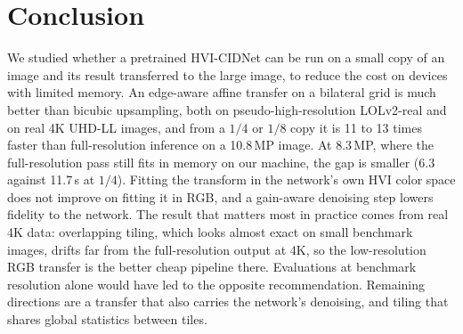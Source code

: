 \documentclass[runningheads]{llncs}
\begin{document}
\section{Conclusion}
We studied whether a pretrained HVI-CIDNet can be run on a small copy of an image and its result transferred to the large image, to reduce the cost on devices with limited memory. An edge-aware affine transfer on a bilateral grid is much better than bicubic upsampling, both on pseudo-high-resolution LOLv2-real and on real 4K UHD-LL images, and from a $1/4$ or $1/8$ copy it is 11 to 13 times faster than full-resolution inference on a 10.8\,MP image. At 8.3\,MP, where the full-resolution pass still fits in memory on our machine, the gap is smaller (6.3 against 11.7\,s at $1/4$). Fitting the transform in the network's own HVI color space does not improve on fitting it in RGB, and a gain-aware denoising step lowers fidelity to the network. The result that matters most in practice comes from real 4K data: overlapping tiling, which looks almost exact on small benchmark images, drifts far from the full-resolution output at 4K, so the low-resolution RGB transfer is the better cheap pipeline there. Evaluations at benchmark resolution alone would have led to the opposite recommendation. Remaining directions are a transfer that also carries the network's denoising, and tiling that shares global statistics between tiles.



\end{document}
